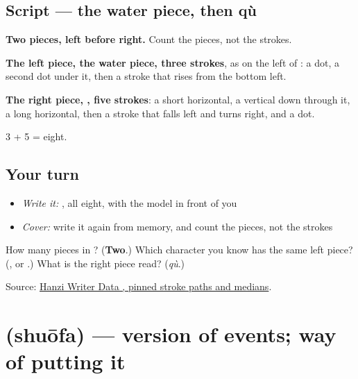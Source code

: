 \subsection*{Script — the water piece, then qù}

\begin{quote}
\end{quote}

\textbf{Two pieces, left before right.} Count the pieces, not the strokes.

\textbf{The left piece, the water piece, three strokes}, as on the left of : a dot, a second dot under it, then a stroke that rises from the bottom left.

\textbf{The right piece, , five strokes}: a short horizontal, a vertical down through it, a long horizontal, then a stroke that falls left and turns right, and a dot.

3 + 5 = eight.

\subsection*{Your turn}
\begin{itemize}
\raggedright
  \item \emph{Write it:} , all eight, with the model in front of you
  \item \emph{Cover:} write it again from memory, and count the pieces, not the strokes
\end{itemize}

\begin{tcolorbox}[breakable,colback=teal!4,colframe=teal!35!black,title={Before you move on}]
How many pieces in ? (\textbf{Two}.) Which character you know has the same left piece? (\textbf{}, or .) What is the right piece read? (\emph{qù}.)

Source: \href{https://raw.githubusercontent.com/chanind/hanzi-writer-data/68d10a4b21150cae5e1ebbd223eed289cf32d90c/data/\%E6\%B3\%95.json}{Hanzi Writer Data , pinned stroke paths and medians}.
\end{tcolorbox}
\section[\texorpdfstring{\zh{说法} (shuōfa)}{说法 (shuōfa)}]{ (shuōfa) — version of events; way of putting it}

